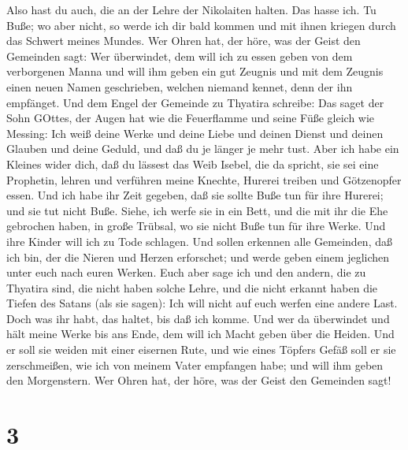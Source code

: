  Also hast du auch, die an der Lehre der Nikolaiten halten.
Das hasse ich.  Tu Buße; wo aber nicht, so werde ich dir
bald kommen und mit ihnen kriegen durch das Schwert meines Mundes.
 Wer Ohren hat, der höre, was der Geist den Gemeinden sagt:
Wer überwindet, dem will ich zu essen geben von dem verborgenen Manna
und will ihm geben ein gut Zeugnis und mit dem Zeugnis einen neuen Namen
geschrieben, welchen niemand kennet, denn der ihn empfänget.
 Und dem Engel der Gemeinde zu Thyatira schreibe: Das saget
der Sohn GOttes, der Augen hat wie die Feuerflamme und seine Füße gleich
wie Messing:  Ich weiß deine Werke und deine Liebe und
deinen Dienst und deinen Glauben und deine Geduld, und daß du je länger
je mehr tust.  Aber ich habe ein Kleines wider dich, daß du
lässest das Weib Isebel, die da spricht, sie sei eine Prophetin, lehren
und verführen meine Knechte, Hurerei treiben und Götzenopfer essen.
 Und ich habe ihr Zeit gegeben, daß sie sollte Buße tun für
ihre Hurerei; und sie tut nicht Buße.  Siehe, ich werfe sie
in ein Bett, und die mit ihr die Ehe gebrochen haben, in große Trübsal,
wo sie nicht Buße tun für ihre Werke.  Und ihre Kinder will
ich zu Tode schlagen. Und sollen erkennen alle Gemeinden, daß ich bin,
der die Nieren und Herzen erforschet; und werde geben einem jeglichen
unter euch nach euren Werken.  Euch aber sage ich und den
andern, die zu Thyatira sind, die nicht haben solche Lehre, und die
nicht erkannt haben die Tiefen des Satans (als sie sagen): Ich will
nicht auf euch werfen eine andere Last.  Doch was ihr habt,
das haltet, bis daß ich komme.  Und wer da überwindet und
hält meine Werke bis ans Ende, dem will ich Macht geben über die Heiden.
 Und er soll sie weiden mit einer eisernen Rute, und wie
eines Töpfers Gefäß soll er sie zerschmeißen,  wie ich von
meinem Vater empfangen habe; und will ihm geben den Morgenstern.
 Wer Ohren hat, der höre, was der Geist den Gemeinden sagt!

\hypertarget{section-1}{%
\section{3}\label{section-1}}

